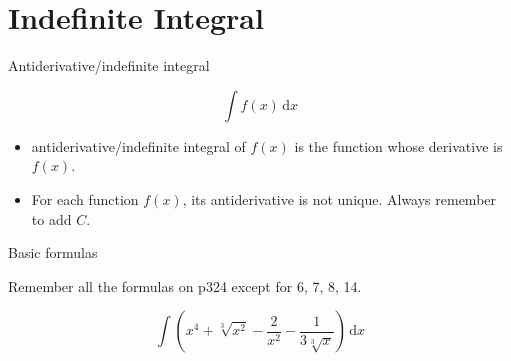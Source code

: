 \section[IndefInt]{Indefinite Integral}
\begin{frame}{Antiderivative/indefinite integral}


\[
\int f\left(x\right)\,\mathrm{d}x
\]



\pause{}
\begin{itemize}
\item antiderivative/indefinite integral of $f\left(x\right)$ is the function
whose derivative is $f\left(x\right)$.
\item For each function $f\left(x\right)$, its antiderivative is not unique.
\alert{Always remember to add $C$}.
\end{itemize}
\end{frame}

\begin{frame}{Basic formulas}


Remember all the formulas on p324 except for 6, 7, 8, 14.
\begin{example}
\[
\int\left(x^{4}+\sqrt[3]{x^{2}}-\frac{2}{x^{2}}-\frac{1}{3\sqrt[3]{x}}\right)\,\mathrm{d}x
\]

\end{example}

\end{frame}

